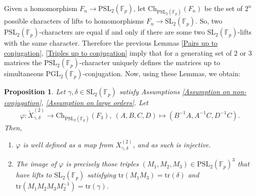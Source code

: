 \documentclass[letterpaper]{amsart}
\newtheorem{proposition}[theorem]{Proposition}
\begin{document}
Given a homomorphism $F_n \to \mathrm{PSL}_2(\mathbb{F}_p)$, let $\mathrm{Ch}_{\mathrm{PSL}_2(\mathbb{F}_p)}(F_n)$ be the set of $2^n$ possible characters of lifts to homomorphisms $F_n \to \mathrm{SL}_2(\mathbb{F}_p)$. So, two $\mathrm{PSL}_2(\mathbb{F}_p)$-characters are equal if and only if there are some two $\mathrm{SL}_2(\mathbb{F}_p)$-lifts with the same character. Therefore the previous Lemmas \ref{Pairs up to conjugation}, \ref{Triples up to conjugation} imply that for a generating set of $2$ or $3$ matrices the $\mathrm{PSL}_2(\mathbb{F}_p)$-character uniquely defines the matrices up to simultaneous $\mathrm{PGL}_2(\mathbb{F}_p)$-conjugation.
Now, using these Lemmas, we obtain:
\begin{proposition}
\label{Characterization of the algebraic variety}
Let $\gamma,\delta \in \mathrm{SL}_2(\mathbb{F}_p)$ satisfy Assumptions \ref{Assumption on non-conjugation}, \ref{Assumption on large orders}.
Let $$\varphi:\tilde{X}^{(2)}_{\gamma,\delta} \to \mathrm{Ch}_{\mathrm{PSL_2}(\mathbb{F}_p)}(F_3),\ (A,B,C,D) \mapsto (B^{-1}A, A^{-1}C, D^{-1}C).$$ Then,
\begin{enumerate}
    \item $\varphi$ is well defined as a map from $X_{\gamma,\delta}^{(2)}$, and as such is injective.
    \item The image of $\varphi$ is precisely those triples $(M_1,M_2,M_3) \in \mathrm{PSL}_2(\mathbb{F}_p)^3$ that have lifts to $\mathrm{SL}_2(\mathbb{F}_p)$ satisfying $\mathrm{tr}(M_1M_3)=\mathrm{tr}(\delta)$ and $\mathrm{tr}(M_1M_2M_3M_2^{-1})=\mathrm{tr}(\gamma)$.
\end{enumerate}
\end{proposition}
\end{document}
